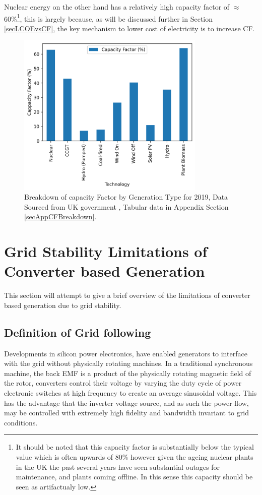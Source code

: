 \documentclass[11pt]{article}
\numberwithin{equation}{section}
\begin{document}
Nuclear energy on the other hand has a relatively high capacity factor of \(\approx\)60\%\footnote{It should be noted that this capacity factor is substantially below the typical value which is often upwards of 80\% however given the ageing nuclear plants in the UK the past several years have seen substantial outages for maintenance, and plants coming offline.  In this sense this capacity should be seen as artifactualy low.}, this is largely because, as will be discussed further in Section \ref{secLCOEvsCF}, the key mechanism to lower cost of electricity is to increase CF.

\begin{figure}[H]
\centering
\includegraphics[width=0.8\textwidth]{./.ob-jupyter/8af7b171434f52c001534a44e0e1e32c5e7c5b94.png}
\caption{\label{figCFBreakdown}Breakdown of capacity Factor by Generation Type for 2019, Data Sourced from UK government \cite{NonRE_CF,RenewableElecricityCap}, Tabular data in Appendix Section \ref{secAppCFBreakdown}.}
\end{figure}
\section{Grid Stability Limitations of Converter based Generation \label{secInertiaLimmitsOfGeneration}}
\label{sec:orgdd72e26}
This section will attempt to give a brief overview of the limitations of converter based generation due to grid stability.

\subsection{Definition of Grid following}
\label{sec:orgc9e0dae}
Developments in silicon power electronics, have enabled generators to interface with the grid without physically rotating machines. In a traditional synchronous machine, the back EMF is a product of the physically rotating magnetic field of the rotor, converters control their voltage by varying the duty cycle of power electronic switches at high frequency to create an average sinusoidal voltage. This has the advantage that the inverter voltage source, and as such the power flow, may be controlled with extremely high fidelity and bandwidth invariant to grid conditions.
\end{document}
